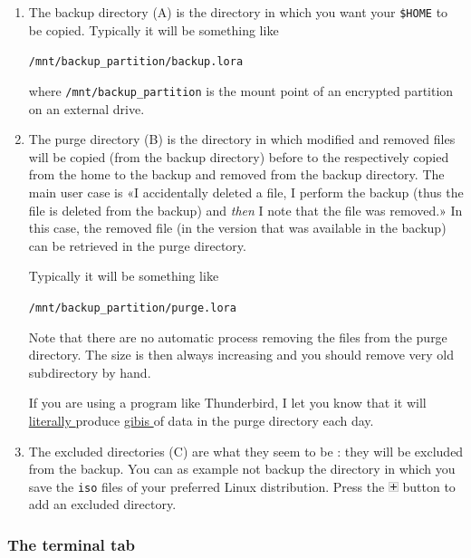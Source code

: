 \documentclass[a4paper,12pt]{article}
\newcommand{\info}[1]{\texttt{#1}}
\begin{document}
\begin{enumerate}
    \item
        The backup directory (A) is the directory in which you want your \info{\$HOME} to be copied. Typically it will be something like
        \begin{center}
            \info{/mnt/backup\_partition/backup.lora}
        \end{center}
        where \info{/mnt/backup\_partition} is the mount point of an encrypted partition on an external drive.
    \item
        The purge directory (B) is the directory in which modified and removed files will be copied (from the backup directory) before to the respectively copied from the home to the backup and removed from the backup directory. The main user case is «I accidentally deleted a file, I perform the backup (thus the file is deleted from the backup) and \emph{then} I note that the file was removed.»  In this case, the removed file (in the version that was available in the backup) can be retrieved in the purge directory.

        Typically it will be something like
        \begin{center}
            \info{/mnt/backup\_partition/purge.lora}
        \end{center}

        Note that there are no automatic process removing the files from the purge directory. The size is then always increasing and you should remove very old subdirectory by hand.

        If you are using a program like Thunderbird, I let you know that it will \href{ http://xkcd.com/725/ }{ literally } produce \href{ https://fr.wikipedia.org/wiki/Gibioctet }{ gibis } of data in the purge directory each day.
    \item
        The excluded directories (C) are what they seem to be : they will be excluded from the backup. You can as example not backup the directory in which you save the \info{iso} files of your preferred Linux distribution. Press the \includegraphics{plus.png} button to add an excluded directory.
\end{enumerate}

\subsubsection{The terminal tab}
\end{document}
